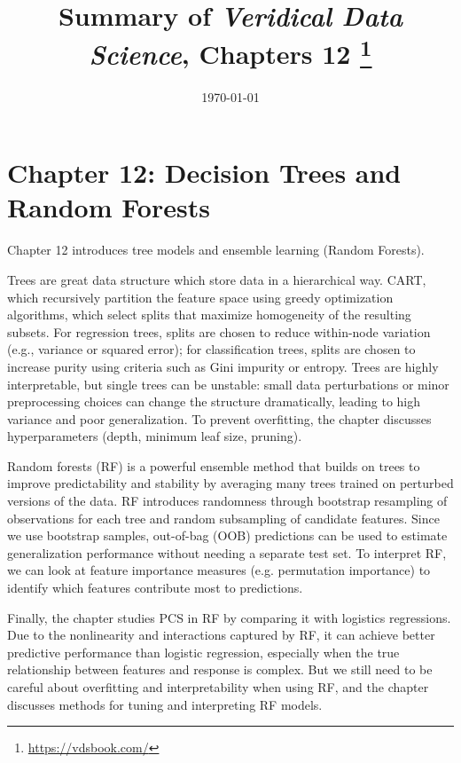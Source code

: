 \documentclass[letterpaper, 11pt]{article}
\title{\vspace{-1.5cm} Summary of \textit{Veridical Data Science}, Chapters 12 \footnote{\url{https://vdsbook.com/}}}
\date{\today}
\begin{document}
\hypersetup{colorlinks=true, linkcolor=blue, urlcolor=blue}
\maketitle

\section*{Chapter 12: Decision Trees and Random Forests}

Chapter 12 introduces tree models and ensemble learning (Random Forests).

Trees are great data structure which store data in a hierarchical way.
CART, which recursively partition the feature space using greedy optimization algorithms, which select splits that maximize homogeneity of the resulting subsets.
For regression trees, splits are chosen to reduce within-node variation (e.g., variance or squared error); for classification trees, splits are chosen to increase purity using criteria such as Gini impurity or entropy.
Trees are highly interpretable, but single trees can be unstable: small data perturbations or minor preprocessing choices can change the structure dramatically, leading to high variance and poor generalization.
To prevent overfitting, the chapter discusses hyperparameters (depth, minimum leaf size, pruning).

Random forests (RF) is a powerful ensemble method that builds on trees to improve predictability and stability by averaging many trees trained on perturbed versions of the data.
RF introduces randomness through bootstrap resampling of observations for each tree and random subsampling of candidate features.
Since we use bootstrap samples, out-of-bag (OOB) predictions can be used to estimate generalization performance without needing a separate test set.
To interpret RF, we can look at feature importance measures (e.g. permutation importance) to identify which features contribute most to predictions.

Finally, the chapter studies PCS in RF by comparing it with logistics regressions.
Due to the nonlinearity and interactions captured by RF, it can achieve better predictive performance than logistic regression, especially when the true relationship between features and response is complex.
But we still need to be careful about overfitting and interpretability when using RF, and the chapter discusses methods for tuning and interpreting RF models.

\end{document}

